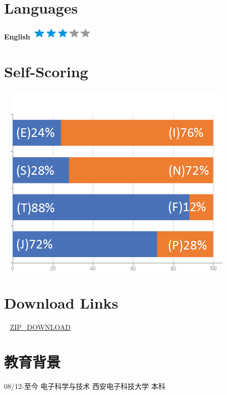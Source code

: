 \documentclass[]{friggeri-cv}
\begin{document}
\newpage


\begin{aside}
~
~
  \section{Languages}
    \textbf{English}\includegraphics[scale=0.40]{img/3stars.png}
  ~    
  \section{Self-Scoring}
    ~
    \includegraphics[scale=0.32]{img/personal.png}
    ~
  \section{Download Links}
    ~
    {\href{http://fengidea.qiniudn.com/ops-pengfeng-xidian.zip}{ZIP\_DOWNLOAD}}
   ~
\end{aside}




\section{教育背景}
08/12\hspace{1mm}-\hspace{1mm}至今 \hspace{30mm} 电子科学与技术 \hspace{7mm}  西安电子科技大学  \hspace{7mm}  本科 \\
\end{document}
